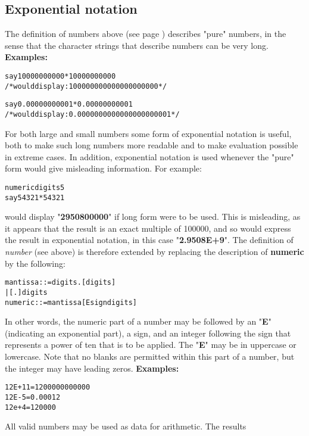 \subsection{Exponential notation}
 The definition of numbers  above (see page \pageref{refdefnum}) 
describes "pure" numbers, in the sense that the character strings
that describe numbers can be very long.
 \textbf{Examples:}
\begin{alltt}
say  10000000000 * 10000000000
/* would display: 100000000000000000000 */

say  0.00000000001 * 0.00000000001
/* would display: 0.0000000000000000000001 */
\end{alltt}
For both large and small numbers some form of exponential notation
is useful, both to make such long numbers more readable and to make
evaluation possible in extreme cases.  In addition, exponential notation
is used whenever the "pure" form would give misleading
information.  For example:
\begin{alltt}
numeric digits 5
say 54321*54321
\end{alltt}
would display "\textbf{2950800000}" if long form were to be
used.
This is misleading, as it appears that the result is an exact multiple
of 100000, and so \nr{} would express the result in exponential
notation, in this case "\textbf{2.9508E+9}".
 The definition of \emph{number} (see above) is therefore extended
by replacing the description of \textbf{numeric} by the following:
\begin{alltt}
mantissa ::=  digits . [digits]
              | [.] digits
numeric  ::=  mantissa [E sign digits]
\end{alltt}
In other words, the numeric part of a number may be followed by an
"\textbf{E}" (indicating an exponential part), a sign,
and an integer following the sign that represents a power of ten that is
to be applied.
The "\textbf{E}" may be in uppercase or lowercase.
Note that no blanks are permitted within this part of a number, but the
integer may have leading zeros.
 \textbf{Examples:}
\begin{alltt}
12E+11  =  1200000000000
12E-5   =  0.00012
 12e+4  =  120000
\end{alltt}
 All valid numbers may be used as data for arithmetic.  The results
